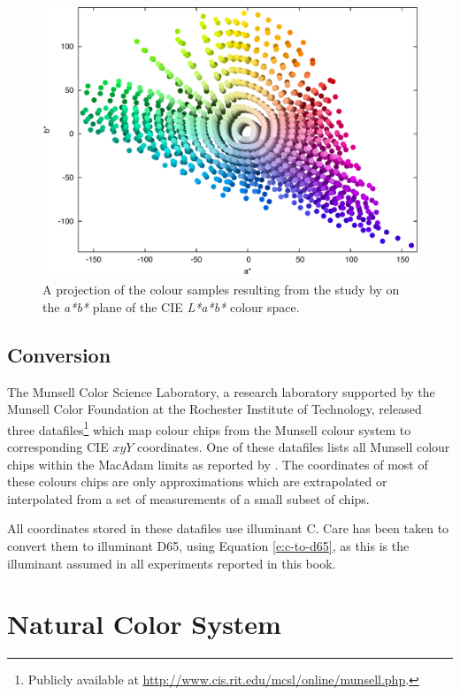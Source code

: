 \begin{figure}[htbp]
\begin{center}
\includegraphics[width=.8\textwidth]{./spaces/figures/real.pdf}
\caption[Colour samples resulting from a study by
\citeauthor{newhall42final}]{A projection of the colour samples
  resulting from the study by \citeauthor{newhall42final} on the
  \emph{a*b*} plane of the CIE \emph{L*a*b*} colour space.}
\label{f:munsell}
\end{center}
\end{figure}

\subsection{Conversion}

The Munsell Color Science Laboratory, a research laboratory supported
by the Munsell Color Foundation at the Rochester Institute of
Technology, released three datafiles\footnote{Publicly available at
  \url{http://www.cis.rit.edu/mcsl/online/munsell.php}.} which map
colour chips from the Munsell colour system to corresponding CIE $xyY$
coordinates. One of these datafiles lists all Munsell colour chips
within the MacAdam limits as reported by \citet{newhall42final}. The
coordinates of most of these colours chips are only approximations
which are extrapolated or interpolated from a set of measurements of a
small subset of chips.

All coordinates stored in these datafiles use illuminant C. Care has
been taken to convert them to illuminant D65, using Equation
\ref{e:c-to-d65}, as this is the illuminant assumed in all experiments
reported in this book.

\section{Natural Color System}
\label{s:NCS}

